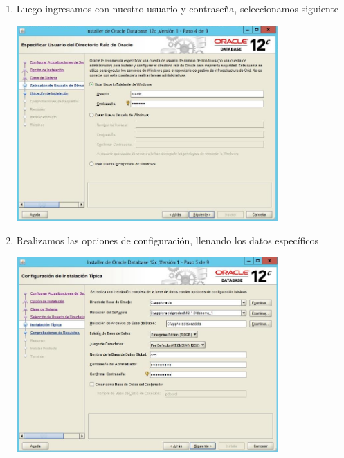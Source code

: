 \begin{enumerate}[1.]
	\hfill \break
	\hfill \break
	\hfill \break
	\hfill \break
	\hfill \break
	\hfill \break
	\hfill \break
	\item Luego ingresamos con nuestro usuario y contraseña, seleccionamos siguiente\\
	\begin{center}
	\includegraphics[width=10cm]{./Imagenes/img16} 
	\end{center}

	\item Realizamos las opciones de configuraci\'on, llenando los datos espec\'ificos\\
	\begin{center}
	\includegraphics[width=10cm]{./Imagenes/img17} 
	\end{center}


\end{enumerate}
